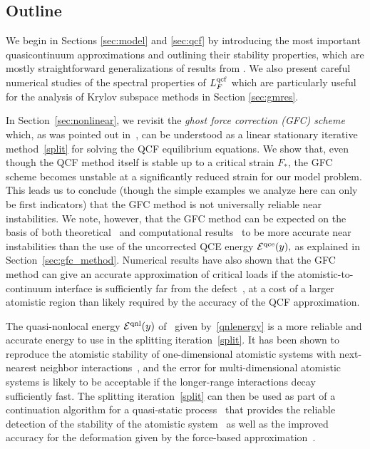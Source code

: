 \documentclass[12pt,reqno]{amsart}
\begin{document}
\subsection{Outline}
We begin in Sections \ref{sec:model} and \ref{sec:qcf} by introducing
the most important quasicontinuum approximations and outlining their
stability properties, which are mostly straightforward generalizations
of results from
\cite{dobs-qcf2,sharpstabilityqcf,doblusort:qce.stab}. We also present
careful numerical studies of the spectral properties of ${L^{{\rm qcf}}_F}$ which
are particularly useful for the analysis of Krylov subspace methods in
Section \ref{sec:gmres}.

In Section~\ref{sec:nonlinear}, we revisit the {\em ghost force
  correction (GFC) scheme}~\cite{Shenoy:1999a} which, as was pointed
out in~\cite{Dobson:2008a}, can be understood as a linear stationary
iterative method~\eqref{split} for solving the QCF equilibrium
equations.  We show that, even though the QCF method itself is stable
up to a critical strain $F_*$, the GFC scheme becomes unstable at a
significantly reduced strain for our model problem. This leads us to
conclude (though the simple examples we analyze here can only be first
indicators) that the GFC method is not universally reliable near
instabilities.  We note, however, that the GFC method can be expected
on the basis of both theoretical~\cite{doblusort:qce.stab} and
computational results~\cite{doblusort:qce.stab,Miller:2008} to be more
accurate near instabilities than the use of the uncorrected QCE energy
${{\mathcal{E}}^{{\rm qce}}}(y),$ as explained in Section~\ref{sec:gfc_method}.  Numerical
results have also shown that the GFC method can give an accurate
approximation of critical loads if the atomistic-to-continuum
interface is sufficiently far from the defect~\cite[Figure
16]{Miller:2008}, at a cost of a larger atomistic region than likely
required by the accuracy of the QCF approximation.

The quasi-nonlocal energy ${{\mathcal{E}}^{{\rm qnl}}}(y)$ of~\cite{Shimokawa:2004} given
by~\eqref{qnlenergy} is a more reliable and accurate
energy to use in the splitting iteration~\eqref{split}.  It has been shown
to reproduce the atomistic stability of one-dimensional atomistic systems
with next-nearest neighbor interactions~\cite{doblusort:qce.stab}, and the error for
multi-dimensional atomistic systems is likely to be acceptable
if the longer-range interactions decay sufficiently fast.
The splitting iteration~\eqref{split} can then be used as part of
a continuation algorithm for a quasi-static process~\cite{dobsonluskin08}
that provides the reliable
detection of the stability of the atomistic
system~\cite{doblusort:qce.stab} as well as the improved accuracy for
the deformation given by the force-based
approximation~\cite{dobs-qcf2}.
\end{document}
